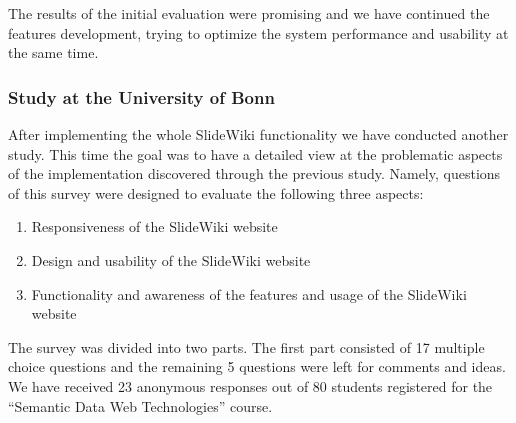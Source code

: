 \documentclass[ngerman,UKenglish,table]{scrbook}
\begin{document}
The results of the initial evaluation were promising and we have continued the features development, trying to optimize the system performance and usability at the same time.

\subsubsection{Study at the University of Bonn}
After implementing the whole SlideWiki functionality we have conducted another study.
This time the goal was to have a detailed view at the problematic aspects of the implementation discovered through the previous study. 
Namely, questions of this survey were designed to evaluate the following three aspects:

\begin{enumerate}
\item Responsiveness of the SlideWiki website
\item Design and usability of the SlideWiki website
\item Functionality and awareness of the features and usage of the SlideWiki website
\end{enumerate}


The survey was divided into two parts.
The first part consisted of 17 multiple choice questions and the remaining 5 questions were left for comments and ideas.
We have received 23 anonymous responses out of 80 students registered for the “Semantic Data Web Technologies” course.
\end{document}

